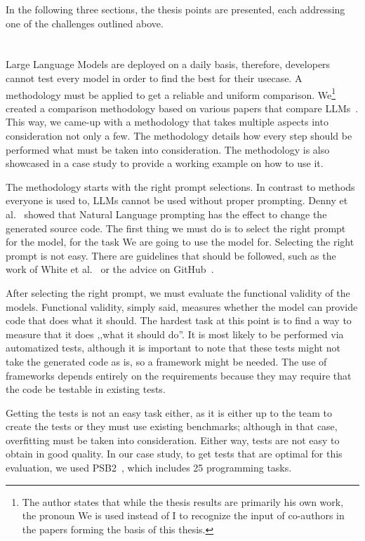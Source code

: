 \documentclass[12pt,a4paper]{extarticle}
\begin{document}
In the following three sections, the thesis points are presented, each addressing one of the challenges outlined above.


\section{\thesispointone}

Large Language Models are deployed on a daily basis, therefore, developers cannot test every model in order to find the best for their usecase.
A methodology must be applied to get a reliable and uniform comparison.
We\footnote{The author states that while the thesis results are primarily his own work, the
	pronoun We is used instead of I to recognize the input of co-authors in the papers
	forming the basis of this thesis.} created a comparison methodology based on various papers that compare LLMs~\cite{copilot_code_evaluation,copilot_code_evaluation2, copilot_code_evaluation_3}.
This way, we came-up with a methodology that takes multiple aspects into consideration not only a few.
The methodology details how every step should be performed what must be taken into consideration.
The methodology is also showcased in a case study to provide a working example on how to use it.

The methodology starts with the right prompt selections.
In contrast to methods everyone is used to, LLMs cannot be used without proper prompting.
Denny et al.~\cite{codex_prompting} showed that Natural Language prompting has the effect to change the generated source code.
The first thing we must do is to select the right prompt for the model, for the task We are going to use the model for.
Selecting the right prompt is not easy.
There are guidelines that should be followed, such as the work of White et al.~\cite{chatgpt_prompt_design} or the advice on GitHub~\cite{github_prompt_engineering}.

After selecting the right prompt, we must evaluate the functional validity of the models.
Functional validity, simply said, measures whether the model can provide code that does what it should.
The hardest task at this point is to find a way to measure that it does ,,what it should do''.
It is most likely to be performed via automatized tests, although it is important to note that these tests might not take the generated code as is, so a framework might be needed.
The use of frameworks depends entirely on the requirements because they may require that the code be testable in existing tests.

Getting the tests is not an easy task either, as it is either up to the team to create the tests or they must use existing benchmarks; although in that case, overfitting must be taken into consideration.
Either way, tests are not easy to obtain in good quality.
In our case study, to get tests that are optimal for this evaluation, we used PSB2~\cite{codegen_benchmark}, which includes 25 programming tasks.
\end{document}
